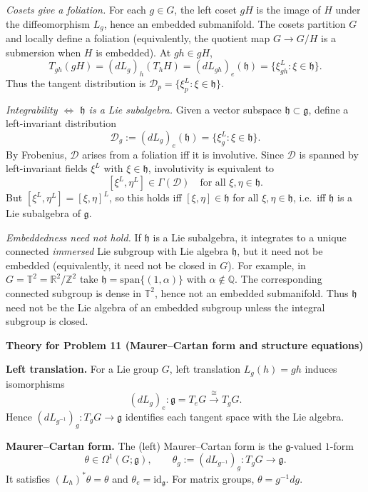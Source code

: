 \begin{solution}
\emph{Cosets give a foliation.}
For each $g\in G$, the left coset $gH$ is the image of $H$ under the diffeomorphism $L_g$, hence an embedded submanifold.
The cosets partition $G$ and locally define a foliation (equivalently, the quotient map $G\to G/H$ is a submersion when $H$
is embedded). At $gh\in gH$,
\[
T_{gh}(gH)=(dL_g)_h(T_hH)=(dL_{gh})_e(\mathfrak h)=\{\xi^L_{gh}:\xi\in\mathfrak h\}.
\]
Thus the tangent distribution is $\mathcal D_p=\{\xi^L_p:\xi\in\mathfrak h\}$.

\emph{Integrability $\Longleftrightarrow$ $\mathfrak h$ is a Lie subalgebra.}
Given a vector subspace $\mathfrak h\subset\mathfrak g$, define a left-invariant distribution
\[
\mathcal D_g:=(dL_g)_e(\mathfrak h)=\{\xi^L_g:\xi\in\mathfrak h\}.
\]
By Frobenius, $\mathcal D$ arises from a foliation iff it is involutive.
Since $\mathcal D$ is spanned by left-invariant fields $\xi^L$ with $\xi\in\mathfrak h$, involutivity is equivalent to
\[
[\xi^L,\eta^L]\in\Gamma(\mathcal D)\quad\text{for all }\xi,\eta\in\mathfrak h.
\]
But $[\xi^L,\eta^L]=[\xi,\eta]^L$, so this holds iff $[\xi,\eta]\in\mathfrak h$ for all $\xi,\eta\in\mathfrak h$,
i.e.\ iff $\mathfrak h$ is a Lie subalgebra of $\mathfrak g$.

\emph{Embeddedness need not hold.}
If $\mathfrak h$ is a Lie subalgebra, it integrates to a unique connected \emph{immersed} Lie subgroup with Lie algebra
$\mathfrak h$, but it need not be embedded (equivalently, it need not be closed in $G$).
For example, in $G=\mathbb T^2=\mathbb R^2/\mathbb Z^2$ take $\mathfrak h=\mathrm{span}\{(1,\alpha)\}$ with
$\alpha\notin\mathbb Q$. The corresponding connected subgroup is dense in $\mathbb T^2$, hence not an embedded submanifold.
Thus $\mathfrak h$ need not be the Lie algebra of an embedded subgroup unless the integral subgroup is closed.

\par\medskip\noindent\textbf{Theory for Problem 11 (Maurer--Cartan form and structure equations)}\par\smallskip


\textbf{Left translation.}
For a Lie group $G$, left translation $L_g(h)=gh$ induces isomorphisms
\[
(dL_g)_e:\mathfrak g=T_eG \xrightarrow{\cong} T_gG.
\]
Hence $(dL_{g^{-1}})_g:T_gG\to\mathfrak g$ identifies each tangent space with the Lie algebra.

\textbf{Maurer--Cartan form.}
The (left) Maurer--Cartan form is the $\mathfrak g$-valued $1$-form
\[
\theta\in\Omega^1(G;\mathfrak g),\qquad \theta_g:=(dL_{g^{-1}})_g:T_gG\to\mathfrak g.
\]
It satisfies $(L_h)^*\theta=\theta$ and $\theta_e=\mathrm{id}_{\mathfrak g}$.
For matrix groups, $\theta=g^{-1}dg$.


\end{solution}
